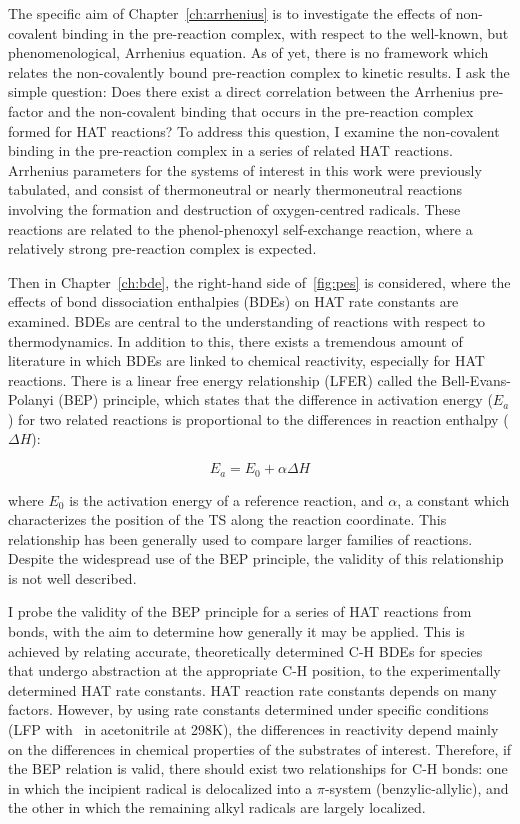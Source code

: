 The specific aim of Chapter~\ref{ch:arrhenius} is to investigate the effects of
non-covalent binding in the pre-reaction complex, with respect to the
well-known, but phenomenological, Arrhenius equation. As of yet, there is no
framework which relates the non-covalently bound pre-reaction complex to kinetic
results. I ask the simple question: Does there exist a direct correlation
between the Arrhenius pre-factor and the non-covalent binding that occurs in the
pre-reaction complex formed for HAT reactions? To address this question, I
examine the non-covalent binding in the pre-reaction complex in a series of
related HAT reactions. Arrhenius parameters for the systems of interest in this
work were previously tabulated,\cite{DiLabio2005} and consist of thermoneutral
or nearly thermoneutral reactions involving the formation and destruction of
oxygen-centred radicals. These reactions are related to the phenol-phenoxyl
self-exchange reaction, where a relatively strong pre-reaction complex is
expected.

Then in Chapter~\ref{ch:bde}, the right-hand side of~\ref{fig:pes} is
considered, where the effects of bond dissociation enthalpies (BDEs) on HAT rate
constants are examined. BDEs are central to the understanding of reactions with
respect to thermodynamics. In addition to this, there exists a tremendous amount
of literature in which BDEs are linked to chemical reactivity, especially for
HAT reactions.\cite{Kochi1973, Tedder1982, Wijtmans2003, Pratt2004, Mayer2004}
There is a linear free energy relationship (LFER) called the Bell-Evans-Polanyi
(BEP) principle,\cite{Bell1936,Evans1938} which states that the difference in
activation energy ($E_a$) for two related reactions is proportional to the
differences in reaction enthalpy ($\Delta H$):

\begin{equation}
  E_a = E_0 + \alpha \Delta H
  \label{eq:bep}
\end{equation}

\noindent where $E_0$ is the activation energy of a reference reaction, and
$\alpha$, a constant which characterizes the position of the TS along the
reaction coordinate. This relationship has been generally used to compare
larger families of reactions. Despite the widespread use of the BEP principle,
the validity of this relationship is not well described.

I probe the validity of the BEP principle for a series of HAT reactions from
 bonds, with the aim to determine how generally it may be applied. This
is achieved by relating accurate, theoretically determined C-H BDEs for species
that undergo abstraction at the appropriate C-H position, to the experimentally
determined HAT rate constants. HAT reaction rate constants depends on many
factors. However, by using rate constants determined under specific conditions
(LFP with \cumo\ in acetonitrile at 298K), the differences in reactivity depend
mainly on the differences in chemical properties of the substrates of interest.
Therefore, if the BEP relation is valid, there should exist two relationships
for C-H bonds: one in which the incipient radical is delocalized into a
$\pi$-system (benzylic-allylic), and the other in which the remaining alkyl
radicals are largely localized.

